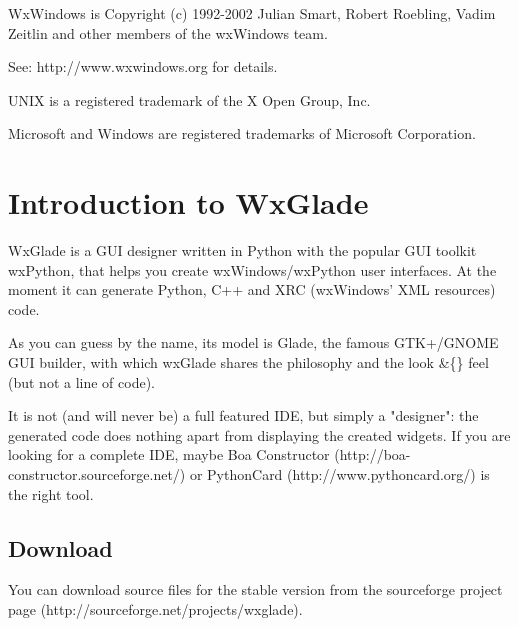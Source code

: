 \documentclass[a4paper,10pt]{book}
\begin{document}
                        WxWindows is Copyright (c) 1992-2002 Julian Smart, Robert Roebling,
                         Vadim Zeitlin and other members of the wxWindows team.
                        
                        
                        See: http://www.wxwindows.org for details.
                        
                        
                        
                        UNIX is a registered trademark of the X Open Group, Inc. 
                        
                        Microsoft and Windows are registered trademarks of Microsoft
                         Corporation. \newpage

                        
\chapter{Introduction to WxGlade}
                            WxGlade is a GUI designer written in Python with the popular
                             GUI toolkit wxPython, that helps you create wxWindows/wxPython
                             user interfaces. At the moment it can generate Python, C++ and
                             XRC (wxWindows' XML resources) code. 
                            
                            As you can guess by the name, its model is Glade, the famous
                             GTK+/GNOME GUI builder, with which wxGlade shares the philosophy
                             and the look \&\{\} feel (but not a line of code).
                            
                            
                            
                            It is not (and will never be) a full featured IDE, but simply
                             a "designer": the generated code does nothing apart from displaying
                             the created widgets. If you are looking for a complete IDE,
                             maybe Boa Constructor (http://boa-constructor.sourceforge.net/)
                             or PythonCard (http://www.pythoncard.org/) is the right tool.
                            
                            
                            
\section{Download}
                                You can download source files for the stable version from the
                                 sourceforge project page (http://sourceforge.net/projects/wxglade).
                                
\end{document}

